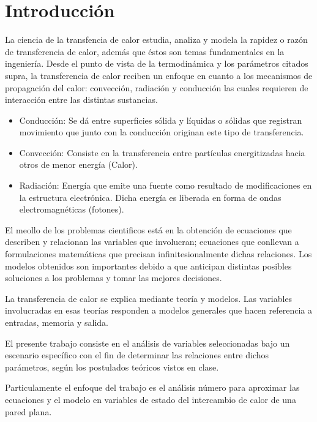 \documentclass[12pt,letterpaper]{article}     %
\begin{document}
\section{Introducción}  
La ciencia de la transfencia de calor estudia, analiza y modela la rapidez o razón de transferencia de calor, además que éstos son temas fundamentales en la ingeniería.
Desde el punto de vista de la termodinámica y los parámetros citados supra, la transferencia de calor reciben un enfoque en cuanto a los mecanismos de propagación del calor: convección, radiación y conducción las cuales requieren de interacción entre las distintas sustancias.
\begin{itemize}
\item Conducción:
Se dá entre superficies sólida y líquidas o sólidas que registran movimiento que junto con la conducción originan este tipo de transferencia.

\item Convección:
Consiste en la transferencia entre partículas energitizadas hacia otros de menor energía (Calor).


\item Radiación:
Energía que emite una fuente como resultado de modificaciones en la estructura electrónica. Dicha energía es liberada en forma de ondas electromagnéticas (fotones).

\end{itemize}
El meollo de los problemas cientificos está en la obtención de ecuaciones que describen y relacionan las variables que involucran; ecuaciones que conllevan a formulaciones matemáticas que precisan infinitesionalmente dichas relaciones.
Los modelos  obtenidos son importantes debido a que anticipan distintas posibles soluciones a los problemas y tomar las mejores decisiones.

La transferencia de calor se explica mediante teoría y modelos. Las variables involucradas en esas teorías responden a modelos generales que hacen referencia a entradas, memoria y salida.

El presente trabajo consiste en el análisis de variables seleccionadas bajo un escenario específico con el fin de determinar las relaciones entre dichos parámetros, según los postulados teóricos vistos en clase.

Particulamente el enfoque del trabajo es el análisis número para aproximar las ecuaciones y el modelo en variables de estado del intercambio de calor de una pared plana.
\end{document}
